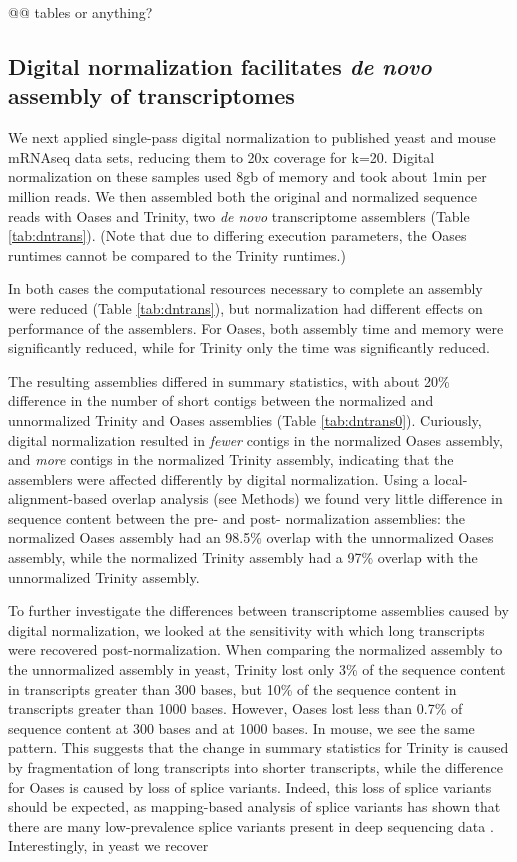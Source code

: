 \documentclass[10pt]{article}
\begin{document}
@@ tables or anything?

\subsection*{Digital normalization facilitates {\em de novo} assembly of transcriptomes}

We next applied single-pass digital normalization to published yeast
and mouse mRNAseq data sets, reducing them to 20x coverage for k=20.
Digital normalization on these samples used 8gb of memory and took
about 1min per million reads.  We then assembled both the original and
normalized sequence reads with Oases and Trinity, two {\em de novo}
transcriptome assemblers (Table \ref{tab:dntrans}).  (Note that due to
differing execution parameters, the Oases runtimes cannot be compared
to the Trinity runtimes.)

In both cases the computational resources necessary to complete an
assembly were reduced (Table \ref{tab:dntrans}), but normalization had
different effects on performance of the assemblers.  For Oases, both
assembly time and memory were significantly reduced, while for Trinity
only the time was significantly reduced.

The resulting assemblies differed in summary statistics, with about
20\% difference in the number of short contigs between the normalized
and unnormalized Trinity and Oases assemblies (Table
\ref{tab:dntrans0}).
Curiously, digital normalization resulted in {\em fewer} contigs in
the normalized Oases assembly, and {\em more} contigs in the
normalized Trinity assembly, indicating that the assemblers were
affected differently by digital normalization.
Using a local-alignment-based overlap analysis (see Methods) we found
very little difference in sequence content between the pre- and post-
normalization assemblies:
the normalized Oases assembly had an 98.5\% overlap with the
unnormalized Oases assembly, while the normalized Trinity assembly had
a 97\% overlap with the unnormalized Trinity assembly.

To further investigate the differences between transcriptome
assemblies caused by digital normalization, we looked at the
sensitivity with which long transcripts were recovered
post-normalization.  When comparing the normalized assembly to the
unnormalized assembly in yeast, Trinity lost only 3\% of the sequence
content in transcripts greater than 300 bases, but 10\% of the
sequence content in transcripts greater than 1000 bases.  However,
Oases lost less than 0.7\% of sequence content at 300 bases and at
1000 bases.  In mouse, we see the same pattern.
This suggests that the change in summary statistics for
Trinity is caused by fragmentation of long transcripts into shorter
transcripts, while the difference for Oases is caused by loss of
splice variants.  Indeed, this
loss of splice variants should be expected, as mapping-based analysis
of splice variants has shown that there are many low-prevalence splice
variants present in deep sequencing data \cite{pubmed21151575}.
Interestingly, in yeast we recover 
\end{document}
